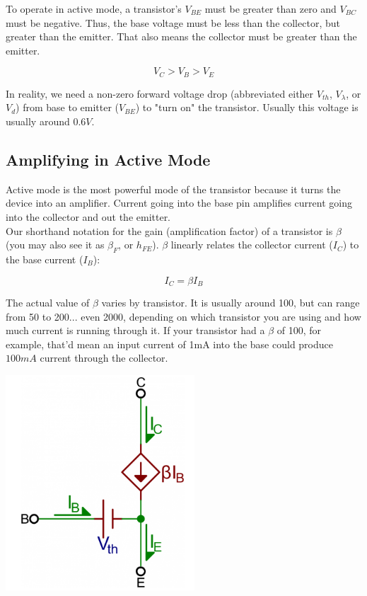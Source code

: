 \documentclass[a4paper, 11pt]{article} %
\begin{document}
To operate in active mode, a transistor's $V_{BE}$ must be greater than zero and $V_{BC}$ must be negative. Thus, the base voltage must be less than the collector, but greater than the emitter. That also means the collector must be greater than the emitter.

$$V_{C} > V_{B} > V_{E}$$

In reality, we need a non-zero forward voltage drop (abbreviated either $V_{th}$, $V_{\lambda}$, or $V_{d}$) from base to emitter ($V_{BE}$) to "turn on" the transistor. Usually this voltage is usually around $0.6V$.

\subsection*{Amplifying in Active Mode}

Active mode is the most powerful mode of the transistor because it turns the device into an amplifier. Current going into the base pin amplifies current going into the collector and out the emitter.\\

Our shorthand notation for the gain (amplification factor) of a transistor is $\beta$ (you may also see it as $\beta_{F}$, or $h_{FE}$). $\beta$ linearly relates the collector current ($I_{C}$) to the base current ($I_{B}$):

$$I_{C} = \beta I_{B}$$

The actual value of $\beta$ varies by transistor. It is usually around 100, but can range from 50 to 200... even 2000, depending on which transistor you are using and how much current is running through it. If your transistor had a $\beta$ of 100, for example, that'd mean an input current of 1mA into the base could produce $100mA$ current through the collector.

\begin{center}
\includegraphics[width=200pt]{tran13}
\end{center}
\end{document}
